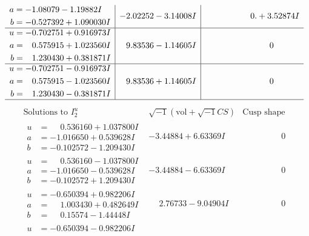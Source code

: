 \documentclass[1p]{elsarticle_modified}
\theoremstyle{definition}
\newcommand{\I}{\sqrt{-1}}
\begin{document}
$$\begin{array}{c|c|c}
\begin{aligned}
a &= -1.08079 - 1.19882 I \\
b &= -0.527392 + 1.090030 I\end{aligned}
 & -2.02252 - 3.14008 I & \phantom{-0.000000 -}0. + 3.52874 I \\ \hline\begin{aligned}
u &= -0.702751 + 0.916973 I \\
a &= \phantom{-}0.575915 + 1.023560 I \\
b &= \phantom{-}1.230430 + 0.381871 I\end{aligned}
 & \phantom{-}9.83536 - 1.14605 I & \phantom{-0.000000 } 0 \\ \hline\begin{aligned}
u &= -0.702751 - 0.916973 I \\
a &= \phantom{-}0.575915 - 1.023560 I \\
b &= \phantom{-}1.230430 - 0.381871 I\end{aligned}
 & \phantom{-}9.83536 + 1.14605 I & \phantom{-0.000000 } 0\\
 \hline 
 \end{array}$$\newpage$$\begin{array}{c|c|c}  
\text{Solutions to }I^u_{2}& \I (\text{vol} + \sqrt{-1}CS) & \text{Cusp shape}\\
 \hline 
\begin{aligned}
u &= \phantom{-}0.536160 + 1.037800 I \\
a &= -1.016650 + 0.539628 I \\
b &= -0.102572 - 1.209430 I\end{aligned}
 & -3.44884 + 6.63369 I & \phantom{-0.000000 } 0 \\ \hline\begin{aligned}
u &= \phantom{-}0.536160 - 1.037800 I \\
a &= -1.016650 - 0.539628 I \\
b &= -0.102572 + 1.209430 I\end{aligned}
 & -3.44884 - 6.63369 I & \phantom{-0.000000 } 0 \\ \hline\begin{aligned}
u &= -0.650394 + 0.982206 I \\
a &= \phantom{-}1.003430 + 0.482649 I \\
b &= \phantom{-}0.15574 - 1.44448 I\end{aligned}
 & \phantom{-}2.76733 - 9.04904 I & \phantom{-0.000000 } 0 \\ \hline\begin{aligned}
u &= -0.650394 - 0.982206 I \\

\end{aligned}
\end{array}$$
\end{document}
